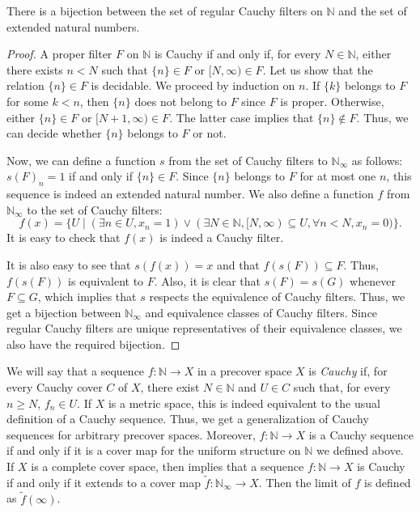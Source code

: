\documentclass[reqno]{amsart}
\theoremstyle{definition}
\theoremstyle{remark}
\numberwithin{figure}{section}
\begin{document}
\begin{prop}
There is a bijection between the set of regular Cauchy filters on $\mathbb{N}$ and the set of extended natural numbers.
\end{prop}
\begin{proof}
A proper filter $F$ on $\mathbb{N}$ is Cauchy if and only if, for every $N \in \mathbb{N}$, either there exists $n < N$ such that $\{ n \} \in F$ or $[N,\infty) \in F$.
Let us show that the relation $\{ n \} \in F$ is decidable.
We proceed by induction on $n$.
If $\{ k \}$ belongs to $F$ for some $k < n$, then $\{ n \}$ does not belong to $F$ since $F$ is proper.
Otherwise, either $\{ n \} \in F$ or $[N + 1, \infty) \in F$.
The latter case implies that $\{ n \} \notin F$.
Thus, we can decide whether $\{ n \}$ belongs to $F$ or not.

Now, we can define a function $s$ from the set of Cauchy filters to $\mathbb{N}_\infty$ as follows: $s(F)_n = 1$ if and only if $\{ n \} \in F$.
Since $\{ n \}$ belongs to $F$ for at most one $n$, this sequence is indeed an extended natural number.
We also define a function $f$ from $\mathbb{N}_\infty$ to the set of Cauchy filters:
\[ f(x) = \{ U \mid (\exists n \in U, x_n = 1) \lor (\exists N \in \mathbb{N}, [N,\infty) \subseteq U, \forall n < N, x_n = 0) \}. \]
It is easy to check that $f(x)$ is indeed a Cauchy filter.

It is also easy to see that $s(f(x)) = x$ and that $f(s(F)) \subseteq F$.
Thus, $f(s(F))$ is equivalent to $F$.
Also, it is clear that $s(F) = s(G)$ whenever $F \subseteq G$, which implies that $s$ respects the equivalence of Cauchy filters.
Thus, we get a bijection between $\mathbb{N}_\infty$ and equivalence classes of Cauchy filters.
Since regular Cauchy filters are unique representatives of their equivalence classes, we also have the required bijection.
\end{proof}

We will say that a sequence $f : \mathbb{N} \to X$ in a precover space $X$ is \emph{Cauchy} if, for every Cauchy cover $C$ of $X$, there exist $N \in \mathbb{N}$ and $U \in C$ such that, for every $n \geq N$, $f_n \in U$.
If $X$ is a metric space, this is indeed equivalent to the usual definition of a Cauchy sequence.
Thus, we get a generalization of Cauchy sequences for arbitrary precover spaces.
Moreover, $f : \mathbb{N} \to X$ is a Cauchy sequence if and only if it is a cover map for the uniform structure on $\mathbb{N}$ we defined above.
If $X$ is a complete cover space, then  implies that a sequence $f : \mathbb{N} \to X$ is Cauchy if and only if it extends to a cover map $\widetilde{f} : \mathbb{N}_\infty \to X$.
Then the limit of $f$ is defined as $\widetilde{f}(\infty)$.
\end{document}
